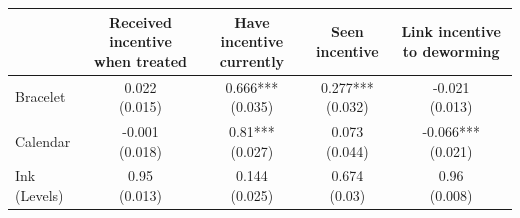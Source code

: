 


\centering
\begin{tabular}[t]{lcccc}
\toprule
 & Received incentive when treated & Have incentive currently & Seen incentive & Link incentive to deworming\\
\midrule
Bracelet & \makecell[c]{0.022\\(0.015)} & \makecell[c]{0.666***\\(0.035)} & \makecell[c]{0.277***\\(0.032)} & \makecell[c]{-0.021\\(0.013)}\\
Calendar & \makecell[c]{-0.001\\(0.018)} & \makecell[c]{0.81***\\(0.027)} & \makecell[c]{0.073\\(0.044)} & \makecell[c]{-0.066***\\(0.021)}\\
\midrule
Ink (Levels) & \makecell[c]{0.95\\(0.013)} & \makecell[c]{0.144\\(0.025)} & \makecell[c]{0.674\\(0.03)} & \makecell[c]{0.96\\(0.008)}\\
\bottomrule
\end{tabular}

